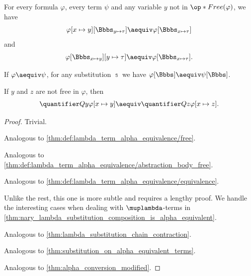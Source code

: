 \begin{proposition}
\begin{thmenum}
     For every formula \( \varphi \), every term \( \psi \) and any variable \( y \) not in \( \op*{Free}(\varphi) \), we have
    \begin{equation}\label{thm:def:fol_formula_alpha_equivalence/contraction/precomposition}
      \varphi[x \mapsto y][\Bbbs_{y \mapsto \tau}]
      \aequiv
      \varphi[\Bbbs_{x \mapsto \tau}]
    \end{equation}
    and
    \begin{equation}\label{thm:def:fol_formula_alpha_equivalence/contraction/composition}
      \varphi[\Bbbs_{x \mapsto y}][y \mapsto \tau]
      \aequiv
      \varphi[\Bbbs_{x \mapsto \tau}].
    \end{equation}

     If \( \varphi \aequiv \psi \), for any substitution \( \Bbbs \) we have \( \varphi[\Bbbs] \aequiv \psi[\Bbbs] \).

     If \( y \) and \( z \) are not free in \( \varphi \), then
    \begin{equation}\label{eq:thm:def:fol_formula_alpha_equivalence/conversion}
      \quantifier Q y \varphi[x \mapsto y] \aequiv \quantifier Q z \varphi[x \mapsto z].
    \end{equation}
  \end{thmenum}
\end{proposition}
\begin{proof}
   Trivial.

   Analogous to \cref{thm:def:lambda_term_alpha_equivalence/free}.

   Analogous to \cref{thm:def:lambda_term_alpha_equivalence/abstraction_body_free}.

   Analogous to \cref{thm:def:lambda_term_alpha_equivalence/equivalence}.

   Unlike the rest, this one is more subtle and requires a lengthy proof. We handle the interesting cases when dealing with \( \muplambda \)-terms in \cref{thm:nary_lambda_substitution_composition_is_alpha_equivalent}.

   Analogous to \cref{thm:lambda_substitution_chain_contraction}.

   Analogous to \cref{thm:substitution_on_alpha_equivalent_terms}.

   Analogous to \cref{thm:alpha_conversion_modified}.
\end{proof}

